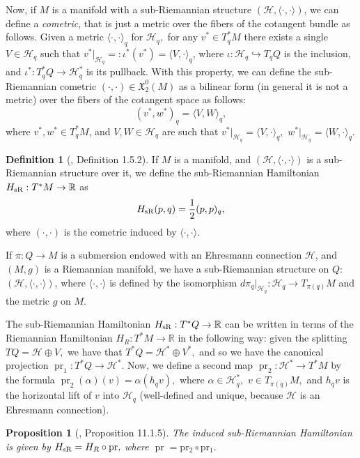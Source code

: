 \documentclass[12pt, letterpaper, reqno]{amsart}
\theoremstyle{definition}
\newtheorem{df}{Definition}
\theoremstyle{plain}
\newtheorem{prop}{Proposition}
\theoremstyle{remark}
\begin{document}
Now, if $ M $ is a manifold with a sub-Riemannian structure $ \left( \mathcal{H}, \langle \cdot,\cdot \rangle \right)  $, we can define a \textit{cometric}, that is just a metric over the fibers of the cotangent bundle as follows. Given a metric $ \langle \cdot,\cdot \rangle_q $ for $ \mathcal{H}_q, $ for any $ v^*\in T^*_qM $ there exists a single $ V\in \mathcal{H}_q $ such that $ v^*|_{\mathcal{H}_q} =:\iota^*(v^*)= \langle V,\cdot \rangle_q $, where $ \iota: \mathcal{H}_q \hookrightarrow T_qQ $ is the inclusion, and $ \iota^*: T_q^*Q \rightarrow \mathcal{H}_q^* $ is its pullback. With this property, we can define the sub-Riemannian cometric $ (\cdot,\cdot)\in \mathfrak{X}_2^0(M) $ as a bilinear form (in general it is not a metric) over the fibers of the cotangent space as follows:
$$ (v^*,w^*)_q= \langle V,W \rangle_q, $$ 
where $ v^*,w^*\in T^*_qM $, and $ V,W\in \mathcal{H}_q $ are such that $ v^*|_{\mathcal{H}_q}= \langle V,\cdot \rangle_q, $ $ w^*|_{\mathcal{H}_q}= \langle W,\cdot \rangle_q. $ 
\begin{df}[\cite{montgomery2002tour}, Definition 1.5.2]
	If $ M $ is a manifold, and $ \left( \mathcal{H}, \langle\cdot,\cdot\rangle \right) $ is a sub-Riemannian structure over it, we define the sub-Riemannian Hamiltonian $ H_{\rm sR}: T^*M \rightarrow \mathbb{R} $ as $$ H_{\rm sR}(p,q)= \frac{1}{2} (p,p)_q, $$   	
	where $ (\cdot,\cdot) $ is the cometric induced by $ \langle\cdot,\cdot\rangle. $ 
\end{df}
If $ \pi: Q \rightarrow M $ is a submersion endowed with an Ehresmann connection $ \mathcal{H} $, and $ (M,g) $ is a Riemannian manifold, we have a sub-Riemannian structure on $ Q: $ $ (\mathcal{H},\langle\cdot,\cdot\rangle) $, where $ \langle\cdot,\cdot\rangle $ is defined by the isomorphism $ d\pi_q|_{\mathcal{H}_q}: \mathcal{H}_q \rightarrow T_{\pi(q)}M $ and the metric $ g $ on $ M. $ 

The sub-Riemannian Hamiltonian $ H_{\rm sR}: T^*Q \rightarrow \mathbb{R}$ can be written in terms of the Riemannian Hamiltonian $ H_R: T^*M \rightarrow \mathbb{R} $ in the following way: given the splitting $ TQ= \mathcal{H}\oplus V, $ we have that $ T^*Q = \mathcal{H}^* \oplus V^*, $ and so we have the canonical projection $ \operatorname{pr}_1: T^*Q \rightarrow \mathcal{H}^*. $ Now, we define a second map $ \operatorname{pr}_2: \mathcal{H}^* \rightarrow T^*M $ by the formula $ \operatorname{pr}_2(\alpha)(v)=\alpha(h_q v), $ where $ \alpha\in \mathcal{H}^*_q, $ $ v\in T_{\pi(q)}M, $ and $h_qv$ is the horizontal lift of $ v $ into $ \mathcal{H}_q $ (well-defined and unique, because $ \mathcal{H} $ is an Ehresmann connection).
\begin{prop}[\cite{montgomery2002tour}, Proposition 11.1.5]
	The induced sub-Riemannian Hamiltonian is given by $H_{\rm sR}= H_R \circ \operatorname{pr},$ where $ \operatorname{pr}= \operatorname{pr_2}\circ \operatorname{pr_1}. $ 
\end{prop}
\end{document}
